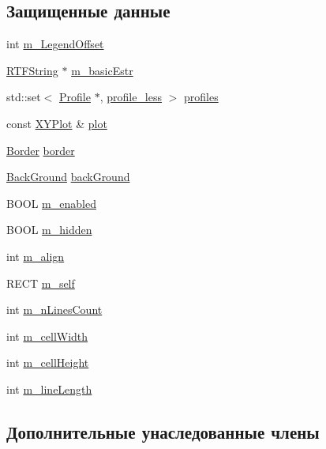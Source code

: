 \subsection*{Защищенные данные}
\begin{DoxyCompactItemize}
\item 
int \hyperlink{class_legend_a63abb8f699af6d3506bc7c8ded4037e0}{m\-\_\-\-Legend\-Offset}
\item 
\hyperlink{class_r_t_f_string}{R\-T\-F\-String} $\ast$ \hyperlink{class_legend_ac52c5c0196d7bddcfab650383f3c88b0}{m\-\_\-basic\-Estr}
\item 
std\-::set$<$ \hyperlink{class_profile}{Profile} $\ast$, \hyperlink{structprofile__less}{profile\-\_\-less} $>$ \hyperlink{class_legend_a418c058072c59c8d2c491852ef3f143b}{profiles}
\item 
const \hyperlink{class_x_y_plot}{X\-Y\-Plot} \& \hyperlink{class_legend_ad033e64a43cceb124ce7b626bdfb695b}{plot}
\item 
\hyperlink{class_border}{Border} \hyperlink{class_legend_ae32f4bc2a9d78cfa069cb242f88cc8f4}{border}
\item 
\hyperlink{class_back_ground}{Back\-Ground} \hyperlink{class_legend_a484eefc380044280c4d44642985293e2}{back\-Ground}
\item 
B\-O\-O\-L \hyperlink{class_legend_a59cedd9de67888759ff39d3fd7c5be45}{m\-\_\-enabled}
\item 
B\-O\-O\-L \hyperlink{class_legend_a7d66848a4111a6a2c0b1fce8ced7d334}{m\-\_\-hidden}
\item 
int \hyperlink{class_legend_a144934b57a8e04a335e6f0d8a39eeb84}{m\-\_\-align}
\item 
R\-E\-C\-T \hyperlink{class_legend_a501285ae1b14654e5ae6a03f7ed4685f}{m\-\_\-self}
\item 
int \hyperlink{class_legend_ac20e23ef899c49a723227dadc21852d0}{m\-\_\-n\-Lines\-Count}
\item 
int \hyperlink{class_legend_a618f51c269707325f1d5a9b20f5544cb}{m\-\_\-cell\-Width}
\item 
int \hyperlink{class_legend_ae505590bc82b4c57bc1af903855490a5}{m\-\_\-cell\-Height}
\item 
int \hyperlink{class_legend_aa5fe3f497876f93e38faa9b248a36fb3}{m\-\_\-line\-Length}
\end{DoxyCompactItemize}
\subsection*{Дополнительные унаследованные члены}


